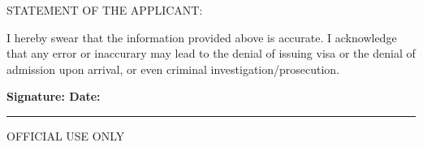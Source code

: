 \parbox{\linewidth}{
	\small
	STATEMENT OF THE APPLICANT:\par\vskip 5pt
	I hereby swear that the information provided above is accurate. I acknowledge that any error or inaccurary may lead to the denial of issuing visa or the denial of admission upon arrival, or even criminal investigation/prosecution.\par\vskip 5pt
	\bfseries
	Signature:\hfill
	Date:\hfill
	\hspace{1pt}\par
}
\vskip 15pt
\hrule
\begin{center}
	\small OFFICIAL USE ONLY
\end{center}





